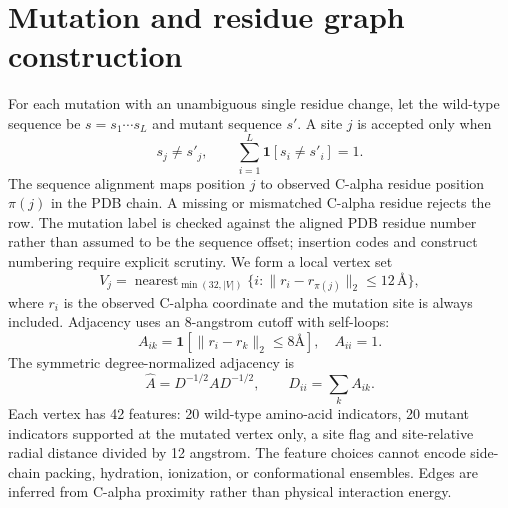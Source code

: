 \documentclass[11pt]{article}
\begin{document}
\section{Mutation and residue graph construction}
For each mutation with an unambiguous single residue change, let the wild-type sequence be $s=s_1\cdots s_L$ and mutant sequence $s'$. A site $j$ is accepted only when
\begin{equation}\label{eq:mutation} s_j\ne s'_j,\qquad \sum_{i=1}^{L}\mathbf{1}[s_i\ne s'_i]=1.\end{equation}
The sequence alignment maps position $j$ to observed C-alpha residue position $\pi(j)$ in the PDB chain. A missing or mismatched C-alpha residue rejects the row. The mutation label is checked against the aligned PDB residue number rather than assumed to be the sequence offset; insertion codes and construct numbering require explicit scrutiny. We form a local vertex set
\begin{equation}V_j=\operatorname{nearest}_{\min(32,|V|)}\{i:\|r_i-r_{\pi(j)}\|_2\leq12\,\text{\AA}\},\end{equation}
where $r_i$ is the observed C-alpha coordinate and the mutation site is always included. Adjacency uses an 8-angstrom cutoff with self-loops:
\begin{equation}A_{ik}=\mathbf{1}[\|r_i-r_k\|_2\leq 8\text{\AA}],\quad A_{ii}=1.\end{equation}
The symmetric degree-normalized adjacency is
\begin{equation}\widehat A = D^{-1/2} A D^{-1/2},\qquad D_{ii}=\sum_k A_{ik}.\end{equation}
Each vertex has 42 features: 20 wild-type amino-acid indicators, 20 mutant indicators supported at the mutated vertex only, a site flag and site-relative radial distance divided by 12 angstrom. The feature choices cannot encode side-chain packing, hydration, ionization, or conformational ensembles. Edges are inferred from C-alpha proximity rather than physical interaction energy.
\end{document}
